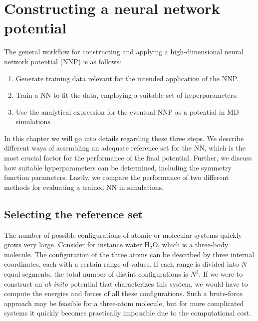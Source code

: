 \documentclass[twoside,english]{uiofysmaster}
\begin{document}
\chapter{Constructing a neural network potential} \label{sec:constructingNNP}
The general workflow for constructing and applying a high-dimensional neural network potential (NNP) is as follows: 
\begin{enumerate}
 \item Generate training data relevant for the intended application of the NNP.
 \item Train a NN to fit the data, employing a suitable set of hyperparameters.
 \item Use the analytical expression for the eventual NNP as a potential in MD simulations.
\end{enumerate}
In this chapter we will go into details regarding these three steps. 
We describe different ways of assembling 
an adequate reference set for the NN, which is the most crucial factor for the performance of 
the final potential. Further, we discuss how suitable hyperparameters can be determined, including the 
symmetry function parameters. Lastly, we compare the performance of two different methods for evaluating a
trained NN in simulations. 




\section{Selecting the reference set} \label{sec:selectingTrainingData}
The number of possible configurations of atomic or molecular systems quickly grows very large. 
Consider for instance water $\textrm{H}_2\textrm{O}$, which is a three-body molecule. The configuration of the
three atoms can be described by three internal coordinates, each with a certain range of values. 
If each range is divided into $N$ equal segments, the total number of distint configurations is $N^3$. 
If we were to construct an \textit{ab inito} potential that characterizes this system, we would have to compute the energies 
and forces of all these configurations. 
Such a brute-force approach may be feasible for a three-atom molecule, but for more complicated systems
it quickly becomes practically impossible due to the computational cost. 
\end{document}
